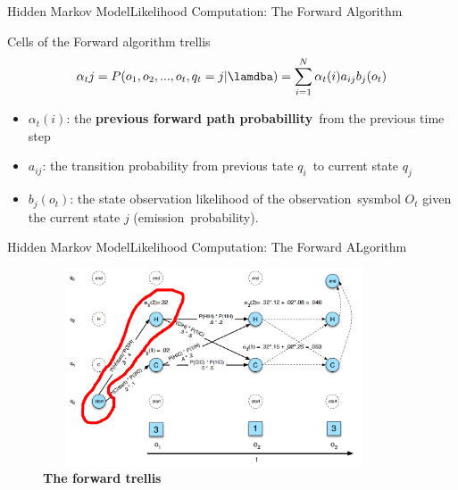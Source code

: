 \documentclass[10pt]{beamer}
\begin{document}
\begin{frame}{Hidden Markov Model}{Likelihood Computation: The Forward Algorithm}
    \begin{block}{Cells of the Forward algorithm trellis}
        \begin{equation}
            \alpha_t{j} = P(o_1, o_2, ..., o_t, q_t = j|\lamdba) = \sum_{i=1}^{N}\alpha_t(i)a_{ij}b_j(o_t)
        \end{equation}
    \end{block}
    \begin{itemize}
        \item $\alpha_t(i)$: the \textbf{previous forward path probabillity}\
                             from the previous time step
        \item $a_{ij}$: the transition probability from previous tate $q_i$\
                        to current state $q_j$
        \item $b_j(o_t)$: the state observation likelihood of the observation\
                          sysmbol $O_t$ given the current state $j$ (emission\
                          probability).
    \end{itemize}
\end{frame}

\begin{frame}{Hidden Markov Model}{Likelihood Computation: The Forward ALgorithm}
  \begin{figure}[h]
    \centering
    \includegraphics[width=4in,height=2.3in]{figures/the_forward_trellis_cells.png}
    \caption {\textbf{The forward trellis}}
  \end{figure}
\end{frame}
\end{document}
